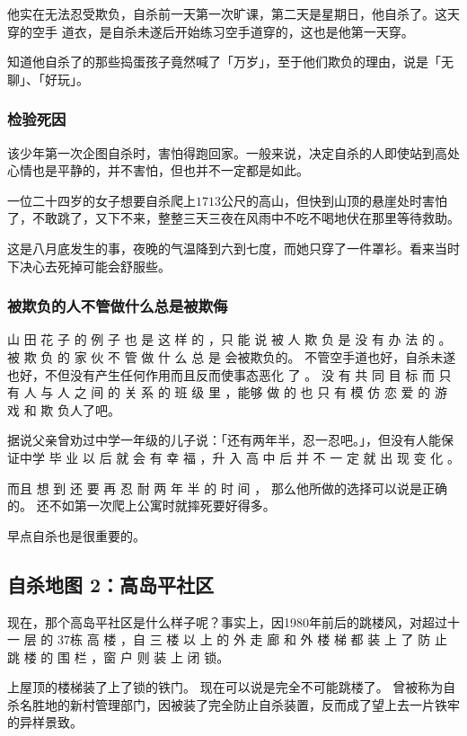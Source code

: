 \documentclass[UTF8]{ctexart}
\begin{document}
他实在无法忍受欺负，自杀前一天第一次旷课，第二天是星期日，他自杀了。这天穿的空手 道衣，是自杀未遂后开始练习空手道穿的，这也是他第一天穿。

知道他自杀了的那些捣蛋孩子竟然喊了「万岁」，至于他们欺负的理由，说是「无聊」、「好玩」。


\subsubsection*{检验死因}

该少年第一次企图自杀时，害怕得跑回家。一般来说，决定自杀的人即使站到高处心情也是平静的，并不害怕，但也并不一定都是如此。

一位二十四岁的女子想要自杀爬上$1713$公尺的高山，但快到山顶的悬崖处时害怕了，不敢跳了，又下不来，整整三天三夜在风雨中不吃不喝地伏在那里等待救助。

这是八月底发生的事，夜晚的气温降到六到七度，而她只穿了一件罩衫。看来当时下决心去死掉可能会舒服些。

\subsubsection*{被欺负的人不管做什么总是被欺侮}

 山 田 花 子 的 例 子 也 是 这 样 的 ，只 能 说 被 人 欺 负 是 没 有 办 法 的 。
被 欺 负 的 家 伙 不 管 做 什 么 总 是 会被欺负的。
不管空手道也好，自杀未遂也好，不但没有产生任何作用而且反而使事态恶化 了 。
没 有 共 同 目 标 而 只 有 人 与 人 之 间 的 关 系 的 班 级 里 ，能够 做 的 也 只 有 模 仿 恋 爱 的 游 戏 和 欺 负人了吧。

据说父亲曾劝过中学一年级的儿子说：「还有两年半，忍一忍吧。」，但没有人能保证中学 毕 业 以 后 就 会 有 幸 福 ，升 入 高 中 后 并 不 一 定 就 出 现 变 化 。

而且 想 到 还 要 再 忍 耐 两 年 半 的 时 间 ， 那么他所做的选择可以说是正确的。
还不如第一次爬上公寓时就摔死要好得多。 

早点自杀也是很重要的。

\subsection{自杀地图 2：高岛平社区}

现在，那个高岛平社区是什么样子呢？事实上，因1980年前后的跳楼风，对超过十一 层 的 $37$栋 高 楼 ，自 三 楼 以 上 的 外 走 廊 和 外 楼 梯 都 装 上 了 防 止 跳 楼 的 围 栏 ，窗 户 则 装 上 闭 锁。

上屋顶的楼梯装了上了锁的铁门。
现在可以说是完全不可能跳楼了。
曾被称为自杀名胜地的新村管理部门，因被装了完全防止自杀装置，反而成了望上去一片铁牢的异样景致。
\end{document}
